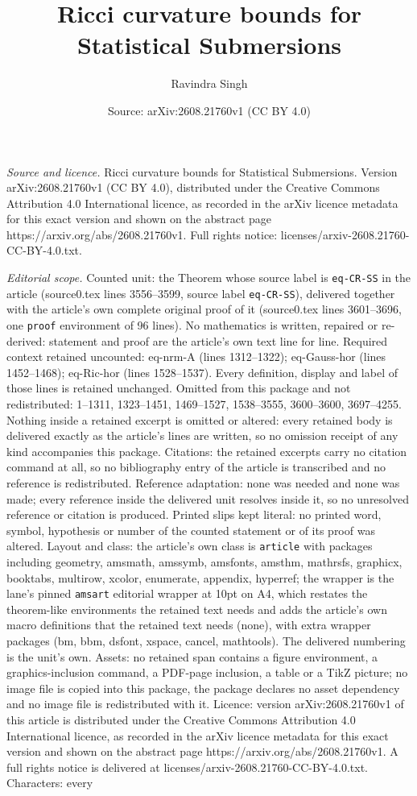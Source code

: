 \documentclass[10pt,a4paper]{amsart}
\title[Ricci curvature bounds for Statistical Submersions]{Ricci curvature bounds for Statistical Submersions}
\author{Ravindra Singh}
\date{Source: arXiv:2608.21760v1 (CC BY 4.0)}
\begin{document}
\maketitle

\noindent\emph{Source and licence.} Ricci curvature bounds for Statistical Submersions. Version arXiv:2608.21760v1 (CC BY 4.0), distributed under the Creative Commons Attribution 4.0 International licence, as recorded in the arXiv licence metadata for this exact version and shown on the abstract page https://arxiv.org/abs/2608.21760v1. Full rights notice: licenses/arxiv-2608.21760-CC-BY-4.0.txt.\par\smallskip

\noindent\textit{Editorial scope.} Counted unit: the Theorem whose source label is \texttt{eq-CR-SS} in the article (source0.tex lines 3556--3599, source label \texttt{eq-CR-SS}), delivered together with the article's own complete original proof of it (source0.tex lines 3601--3696, one \texttt{proof} environment of 96 lines). No mathematics is written, repaired or re-derived: statement and proof are the article's own text line for line. Required context retained uncounted: eq-nrm-A (lines 1312--1322); eq-Gauss-hor (lines 1452--1468); eq-Ric-hor (lines 1528--1537). Every definition, display and label of those lines is retained unchanged. Omitted from this package and not redistributed: 1--1311, 1323--1451, 1469--1527, 1538--3555, 3600--3600, 3697--4255. Nothing inside a retained excerpt is omitted or altered: every retained body is delivered exactly as the article's lines are written, so no omission receipt of any kind accompanies this package. Citations: the retained excerpts carry no citation command at all, so no bibliography entry of the article is transcribed and no reference is redistributed. Reference adaptation: none was needed and none was made; every reference inside the delivered unit resolves inside it, so no unresolved reference or citation is produced. Printed slips kept literal: no printed word, symbol, hypothesis or number of the counted statement or of its proof was altered. Layout and class: the article's own class is \texttt{article} with packages including geometry, amsmath, amssymb, amsfonts, amsthm, mathrsfs, graphicx, booktabs, multirow, xcolor, enumerate, appendix, hyperref; the wrapper is the lane's pinned \texttt{amsart} editorial wrapper at 10pt on A4, which restates the theorem-like environments the retained text needs and adds the article's own macro definitions that the retained text needs (none), with extra wrapper packages (bm, bbm, dsfont, xspace, cancel, mathtools). The delivered numbering is the unit's own. Assets: no retained span contains a figure environment, a graphics-inclusion command, a PDF-page inclusion, a table or a TikZ picture; no image file is copied into this package, the package declares no asset dependency and no image file is redistributed with it. Licence: version arXiv:2608.21760v1 of this article is distributed under the Creative Commons Attribution 4.0 International licence, as recorded in the arXiv licence metadata for this exact version and shown on the abstract page https://arxiv.org/abs/2608.21760v1. A full rights notice is delivered at licenses/arxiv-2608.21760-CC-BY-4.0.txt. Characters: every 
\end{document}
